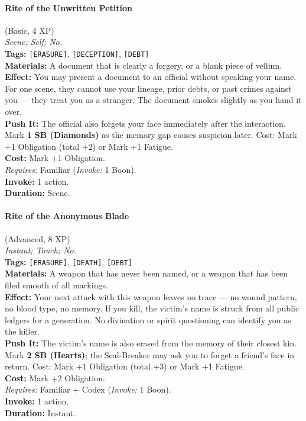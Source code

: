 \paragraph{Rite of the Unwritten Petition} (Basic, 4 XP) \hfill \\
\emph{Scene; Self; No.} \\
\textbf{Tags:} \texttt{[ERASURE]}, \texttt{[DECEPTION]}, \texttt{[DEBT]} \\
\textbf{Materials:} A document that is clearly a forgery, or a blank piece of vellum. \\
\textbf{Effect:} You may present a document to an official without speaking your name. For one scene, they cannot use your lineage, prior debts, or past crimes against you --- they treat you as a stranger. The document smokes slightly as you hand it over. \\
\textbf{Push It:} The official also forgets your face immediately after the interaction. Mark \textbf{1 SB (Diamonds)} as the memory gap causes suspicion later. Cost: Mark +1 Obligation (total +2) or Mark +1 Fatigue. \\
\textbf{Cost:} Mark +1 Obligation. \\
\textit{Requires:} Familiar (\textit{Invoke:} 1 Boon). \\
\textbf{Invoke:} 1 action. \\
\textbf{Duration:} Scene.

\paragraph{Rite of the Anonymous Blade} (Advanced, 8 XP) \hfill \\
\emph{Instant; Touch; No.} \\
\textbf{Tags:} \texttt{[ERASURE]}, \texttt{[DEATH]}, \texttt{[DEBT]} \\
\textbf{Materials:} A weapon that has never been named, or a weapon that has been filed smooth of all markings. \\
\textbf{Effect:} Your next attack with this weapon leaves no trace --- no wound pattern, no blood type, no memory. If you kill, the victim's name is struck from all public ledgers for a generation. No divination or spirit questioning can identify you as the killer. \\
\textbf{Push It:} The victim's name is also erased from the memory of their closest kin. Mark \textbf{2 SB (Hearts)}; the Seal-Breaker may ask you to forget a friend's face in return. Cost: Mark +1 Obligation (total +3) or Mark +1 Fatigue. \\
\textbf{Cost:} Mark +2 Obligation. \\
\textit{Requires:} Familiar + Codex (\textit{Invoke:} 1 Boon). \\
\textbf{Invoke:} 1 action. \\
\textbf{Duration:} Instant.

